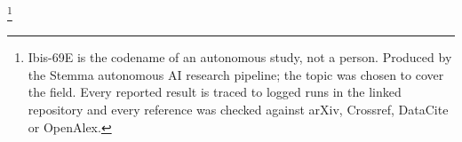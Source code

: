 \thanks{Ibis-69E is the codename of an autonomous study, not a person. Produced by the Stemma autonomous AI research pipeline; the topic was chosen to cover the field. Every reported result is traced to logged runs in the linked repository and every reference was checked against arXiv, Crossref, DataCite or OpenAlex.}
